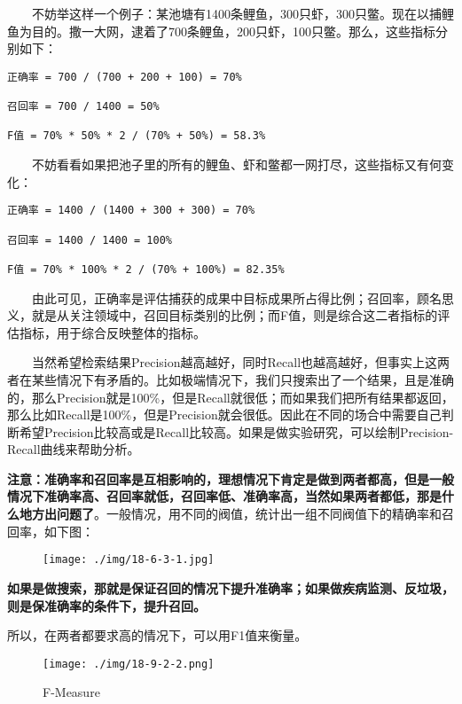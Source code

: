   不妨举这样一个例子：某池塘有1400条鲤鱼，300只虾，300只鳖。现在以捕鲤鱼为目的。撒一大网，逮着了700条鲤鱼，200只虾，100只鳖。那么，这些指标分别如下：

\begin{verbatim}
正确率 = 700 / (700 + 200 + 100) = 70%

召回率 = 700 / 1400 = 50%

F值 = 70% * 50% * 2 / (70% + 50%) = 58.3%
\end{verbatim}

  不妨看看如果把池子里的所有的鲤鱼、虾和鳖都一网打尽，这些指标又有何变化：

\begin{verbatim}
正确率 = 1400 / (1400 + 300 + 300) = 70%

召回率 = 1400 / 1400 = 100%

F值 = 70% * 100% * 2 / (70% + 100%) = 82.35%        
\end{verbatim}

  由此可见，正确率是评估捕获的成果中目标成果所占得比例；召回率，顾名思义，就是从关注领域中，召回目标类别的比例；而F值，则是综合这二者指标的评估指标，用于综合反映整体的指标。

  当然希望检索结果Precision越高越好，同时Recall也越高越好，但事实上这两者在某些情况下有矛盾的。比如极端情况下，我们只搜索出了一个结果，且是准确的，那么Precision就是100\%，但是Recall就很低；而如果我们把所有结果都返回，那么比如Recall是100\%，但是Precision就会很低。因此在不同的场合中需要自己判断希望Precision比较高或是Recall比较高。如果是做实验研究，可以绘制Precision-Recall曲线来帮助分析。

​
\textbf{注意：准确率和召回率是互相影响的，理想情况下肯定是做到两者都高，但是一般情况下准确率高、召回率就低，召回率低、准确率高，当然如果两者都低，那是什么地方出问题了}。一般情况，用不同的阀值，统计出一组不同阀值下的精确率和召回率，如下图：

\begin{figure}
\centering
\texttt{[image: ./img/18-6-3-1.jpg]}
\caption{}
\end{figure}

\textbf{如果是做搜索，那就是保证召回的情况下提升准确率；如果做疾病监测、反垃圾，则是保准确率的条件下，提升召回。}

所以，在两者都要求高的情况下，可以用F1值来衡量。

\begin{figure}
\centering
\texttt{[image: ./img/18-9-2-2.png]}
\caption{F-Measure}
\end{figure}

